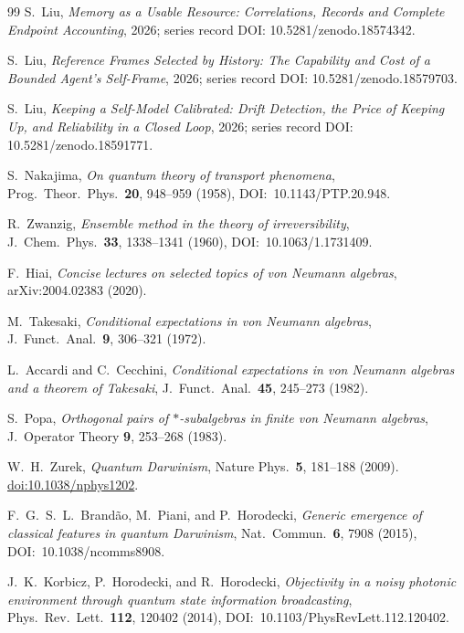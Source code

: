 \documentclass[12pt]{article}
\theoremstyle{definition}
\theoremstyle{remark}
\begin{document}
\begin{thebibliography}{99}
S.~Liu, \emph{Memory as a Usable Resource: Correlations, Records and Complete Endpoint Accounting}, 2026; series record DOI: 10.5281/zenodo.18574342.

S.~Liu, \emph{Reference Frames Selected by History: The Capability and Cost of a Bounded Agent's Self-Frame}, 2026; series record DOI: 10.5281/zenodo.18579703.

S.~Liu, \emph{Keeping a Self-Model Calibrated: Drift Detection, the Price of Keeping Up, and Reliability in a Closed Loop}, 2026; series record DOI: 10.5281/zenodo.18591771.

S.~Nakajima,
\emph{On quantum theory of transport phenomena},
Prog.\ Theor.\ Phys.\ \textbf{20}, 948--959 (1958), DOI:~10.1143/PTP.20.948.

R.~Zwanzig,
\emph{Ensemble method in the theory of irreversibility},
J.\ Chem.\ Phys.\ \textbf{33}, 1338--1341 (1960), DOI:~10.1063/1.1731409.

F.~Hiai, \emph{Concise lectures on selected topics of von Neumann algebras}, arXiv:2004.02383 (2020).

M.~Takesaki,
\emph{Conditional expectations in von Neumann algebras},
J.\ Funct.\ Anal.\ \textbf{9}, 306--321 (1972).

L.~Accardi and C.~Cecchini,
\emph{Conditional expectations in von Neumann algebras and a theorem of
Takesaki},
J.\ Funct.\ Anal.\ \textbf{45}, 245--273 (1982).

S.~Popa,
\emph{Orthogonal pairs of \(*\)-subalgebras in finite von Neumann
algebras},
J.\ Operator Theory \textbf{9}, 253--268 (1983).

W.~H.~Zurek,
\emph{Quantum Darwinism},
Nature Phys.\ \textbf{5}, 181--188 (2009).
\href{https://doi.org/10.1038/nphys1202}{doi:10.1038/nphys1202}.

F.~G.~S.~L.~Brand\~ao, M.~Piani, and P.~Horodecki,
\emph{Generic emergence of classical features in quantum Darwinism},
Nat.\ Commun.\ \textbf{6}, 7908 (2015), DOI:~10.1038/ncomms8908.

J.~K.~Korbicz, P.~Horodecki, and R.~Horodecki,
\emph{Objectivity in a noisy photonic environment through quantum state information broadcasting},
Phys.\ Rev.\ Lett.\ \textbf{112}, 120402 (2014), DOI:~10.1103/PhysRevLett.112.120402.

\end{thebibliography}
 
\end{document}
